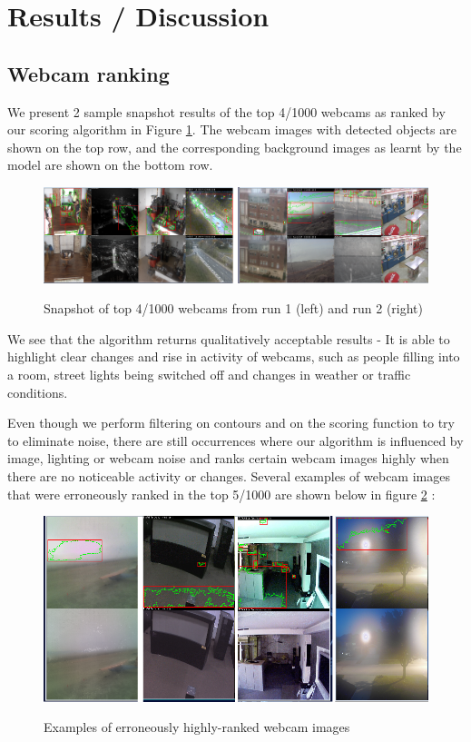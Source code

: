 \documentclass[10pt]{article} %
\begin{document}
\section{Results / Discussion}
\subsection{Webcam ranking}
We present 2 sample snapshot results of the top 4/1000 webcams as ranked by our scoring algorithm in Figure \ref{webcamSamples}. The webcam images with detected objects are shown on the top row, and the corresponding background images as learnt by the model are shown on the bottom row. 
\begin{figure}[H]
\centering
\caption{Snapshot of top 4/1000 webcams from run 1 (left) and run 2 (right)}
\includegraphics[scale = 0.5]{wc}
\label{webcamSamples}
\end{figure}
We see that the algorithm returns qualitatively acceptable results - It is able to highlight clear changes and rise in activity of webcams, such as people filling into a room, street lights being switched off and changes in weather or traffic conditions.

Even though we perform filtering on contours and on the scoring function to try to eliminate noise, there are still occurrences where our algorithm is influenced by image, lighting or webcam noise and ranks certain webcam images highly when there are no noticeable activity or changes. Several examples of webcam images that were erroneously ranked in the top 5/1000 are shown below in figure \ref{webcamFails} :
\begin{figure}[H]
\centering
\caption{Examples of erroneously highly-ranked webcam images}
\includegraphics[scale = 0.5]{fails}
\label{webcamFails}
\end{figure}
\end{document}
